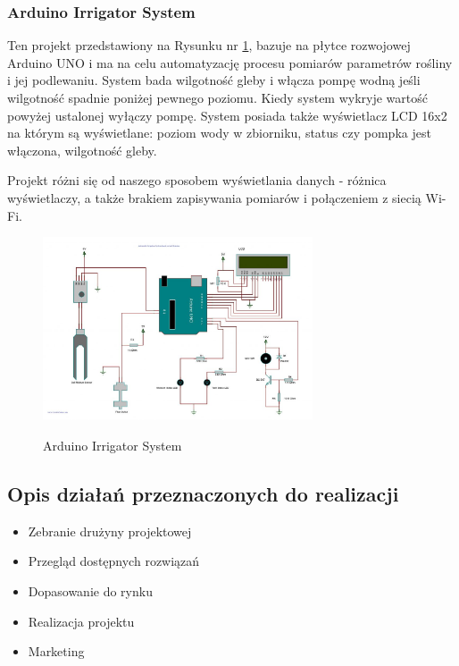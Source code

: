 \documentclass[12pt]{article}
\begin{document}
\newpage
\subsubsection{Arduino Irrigator System }

Ten projekt przedstawiony na Rysunku nr \ref{fig:ArduinoIS}, bazuje na płytce rozwojowej Arduino UNO i ma na celu automatyzację procesu pomiarów parametrów rośliny i jej podlewaniu. System bada wilgotność gleby i włącza pompę wodną jeśli wilgotność spadnie poniżej pewnego poziomu. Kiedy system wykryje wartość powyżej ustalonej wyłączy pompę. System posiada także wyświetlacz LCD 16x2 na którym są wyświetlane: poziom wody w zbiorniku, status czy pompka jest włączona, wilgotność gleby.

Projekt różni się od naszego sposobem wyświetlania danych - różnica wyświetlaczy, a także brakiem zapisywania pomiarów i połączeniem z siecią Wi-Fi.



\begin{figure}[!h]
	\begin{center}
		{\includegraphics[width=8cm]{arduino_przyklad2.jpg}}
	\end{center}
	\caption{Arduino Irrigator System ~\cite{ArduinoIS}}
	\label{fig:ArduinoIS}
\end{figure}




\subsection{Opis działań przeznaczonych do realizacji }

\begin{itemize}
	\item Zebranie drużyny projektowej
	
	\item Przegląd dostępnych rozwiązań
	
	\item Dopasowanie do rynku
	\item Realizacja projektu
	\item Marketing 
\end{itemize}
\end{document}
